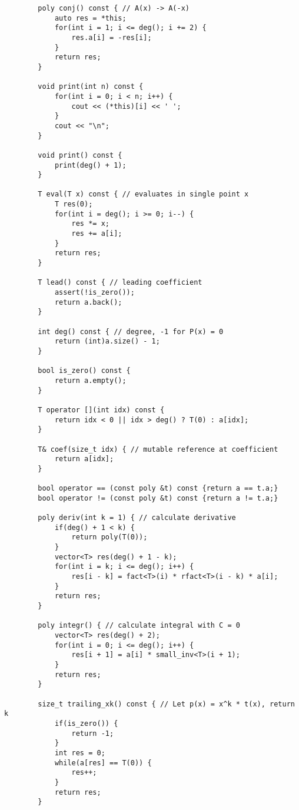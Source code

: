 \begin{lstlisting}
        poly conj() const { // A(x) -> A(-x)
            auto res = *this;
            for(int i = 1; i <= deg(); i += 2) {
                res.a[i] = -res[i];
            }
            return res;
        }
        
        void print(int n) const {
            for(int i = 0; i < n; i++) {
                cout << (*this)[i] << ' ';
            }
            cout << "\n";
        }
        
        void print() const {
            print(deg() + 1);
        }
        
        T eval(T x) const { // evaluates in single point x
            T res(0);
            for(int i = deg(); i >= 0; i--) {
                res *= x;
                res += a[i];
            }
            return res;
        }
        
        T lead() const { // leading coefficient
            assert(!is_zero());
            return a.back();
        }
        
        int deg() const { // degree, -1 for P(x) = 0
            return (int)a.size() - 1;
        }
        
        bool is_zero() const {
            return a.empty();
        }
        
        T operator [](int idx) const {
            return idx < 0 || idx > deg() ? T(0) : a[idx];
        }
        
        T& coef(size_t idx) { // mutable reference at coefficient
            return a[idx];
        }
        
        bool operator == (const poly &t) const {return a == t.a;}
        bool operator != (const poly &t) const {return a != t.a;}
        
        poly deriv(int k = 1) { // calculate derivative
            if(deg() + 1 < k) {
                return poly(T(0));
            }
            vector<T> res(deg() + 1 - k);
            for(int i = k; i <= deg(); i++) {
                res[i - k] = fact<T>(i) * rfact<T>(i - k) * a[i];
            }
            return res;
        }
        
        poly integr() { // calculate integral with C = 0
            vector<T> res(deg() + 2);
            for(int i = 0; i <= deg(); i++) {
                res[i + 1] = a[i] * small_inv<T>(i + 1);
            }
            return res;
        }
        
        size_t trailing_xk() const { // Let p(x) = x^k * t(x), return k
            if(is_zero()) {
                return -1;
            }
            int res = 0;
            while(a[res] == T(0)) {
                res++;
            }
            return res;
        }
        

\end{lstlisting}

